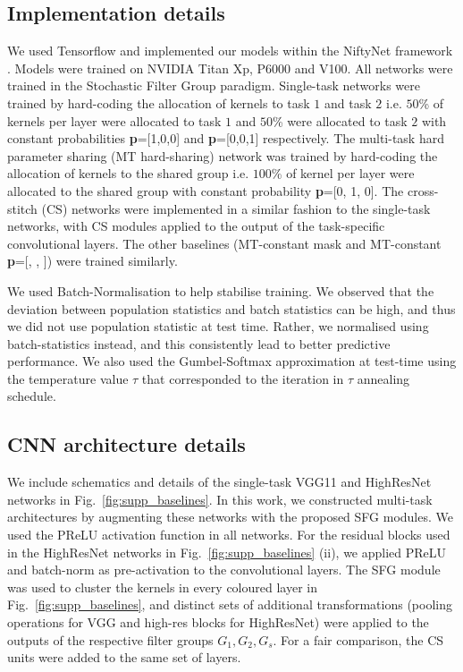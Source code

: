 \subsection{Implementation details}
We used Tensorflow and implemented our models within the NiftyNet framework \cite{Gibson2018}. Models were trained on NVIDIA Titan Xp, P6000 and V100. All networks were trained in the Stochastic Filter Group paradigm. Single-task networks were trained by hard-coding the allocation of kernels to task $1$ and task $2$ i.e. $50$\% of kernels per layer were allocated to task $1$ and $50$\% were allocated to task $2$ with constant probabilities \textbf{p}=[1,0,0] and \textbf{p}=[0,0,1] respectively. The multi-task hard parameter sharing (MT hard-sharing) network was trained by hard-coding the allocation of kernels to the shared group i.e. $100$\% of kernel per layer were allocated to the shared group with constant probability \textbf{p}=[0, 1, 0]. The cross-stitch (CS) \cite{MisraCrossMTL16} networks were implemented in a similar fashion to the single-task networks, with CS modules applied to the output of the task-specific convolutional layers. The other baselines (MT-constant mask and MT-constant \textbf{p}=[, , ]) were trained similarly.

We used Batch-Normalisation \cite{ioffe2015batch} to help stabilise training. We observed that the deviation between population statistics and batch statistics can be high, and thus we did not use population statistic at test time. Rather, we normalised using batch-statistics instead, and this consistently lead to better predictive performance. We also used the Gumbel-Softmax approximation \cite{jang2016categorical} at test-time using the temperature value $\tau$ that corresponded to the iteration in $\tau$ annealing schedule.

\subsection{CNN architecture details}
We include schematics and details of the single-task VGG11 \cite{vgg} and HighResNet \cite{wenqi} networks in Fig.~\ref{fig:supp_baselines}. In this work, we constructed multi-task architectures by augmenting these networks with the proposed SFG modules. We used the PReLU activation function \cite{prelu} in all networks. For the residual blocks used in the HighResNet networks in Fig.~\ref{fig:supp_baselines} (ii), we applied PReLU and batch-norm as pre-activation \cite{preactivation} to the convolutional layers. The SFG module was used to cluster the kernels in every coloured layer in Fig.~\ref{fig:supp_baselines}, and distinct sets of additional transformations (pooling operations for VGG and high-res blocks for HighResNet) were applied to the outputs of the respective filter groups $G_{1}, G_{2}, G_{s}$. For a fair comparison, the CS units \cite{MisraCrossMTL16} were added to the same set of layers.

